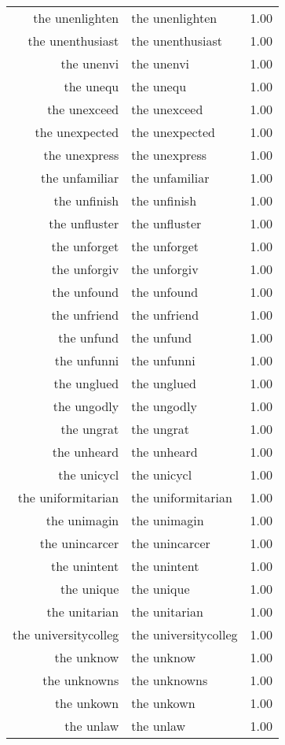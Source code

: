 \begin{table}[ht]
\begin{tabular}{rlr}
  the unenlighten & the unenlighten & 1.00 \\ 
  the unenthusiast & the unenthusiast & 1.00 \\ 
  the unenvi & the unenvi & 1.00 \\ 
  the unequ & the unequ & 1.00 \\ 
  the unexceed & the unexceed & 1.00 \\ 
  the unexpected & the unexpected & 1.00 \\ 
  the unexpress & the unexpress & 1.00 \\ 
  the unfamiliar & the unfamiliar & 1.00 \\ 
  the unfinish & the unfinish & 1.00 \\ 
  the unfluster & the unfluster & 1.00 \\ 
  the unforget & the unforget & 1.00 \\ 
  the unforgiv & the unforgiv & 1.00 \\ 
  the unfound & the unfound & 1.00 \\ 
  the unfriend & the unfriend & 1.00 \\ 
  the unfund & the unfund & 1.00 \\ 
  the unfunni & the unfunni & 1.00 \\ 
  the unglued & the unglued & 1.00 \\ 
  the ungodly & the ungodly & 1.00 \\ 
  the ungrat & the ungrat & 1.00 \\ 
  the unheard & the unheard & 1.00 \\ 
  the unicycl & the unicycl & 1.00 \\ 
  the uniformitarian & the uniformitarian & 1.00 \\ 
  the unimagin & the unimagin & 1.00 \\ 
  the unincarcer & the unincarcer & 1.00 \\ 
  the unintent & the unintent & 1.00 \\ 
  the unique & the unique & 1.00 \\ 
  the unitarian & the unitarian & 1.00 \\ 
  the universitycolleg & the universitycolleg & 1.00 \\ 
  the unknow & the unknow & 1.00 \\ 
  the unknowns & the unknowns & 1.00 \\ 
  the unkown & the unkown & 1.00 \\ 
  the unlaw & the unlaw & 1.00 \\ 

\end{tabular}
\end{table}
